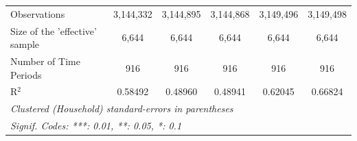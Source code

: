\begin{table}[htbp]
\begin{tabular}{lccccc}
      Observations                                     & 3,144,332      & 3,144,895      & 3,144,868       & 3,149,496       & 3,149,498\\  
      Size of the 'effective' sample                   & 6,644          & 6,644          & 6,644           & 6,644           & 6,644\\  
      Number of Time Periods                           & 916            & 916            & 916             & 916             & 916\\  
      R$^2$                                            & 0.58492        & 0.48960        & 0.48941         & 0.62045         & 0.66824\\  
      \midrule \midrule
      \multicolumn{6}{l}{\emph{Clustered (Household) standard-errors in parentheses}}\\
      \multicolumn{6}{l}{\emph{Signif. Codes: ***: 0.01, **: 0.05, *: 0.1}}\\
   \end{tabular}
\end{table}


